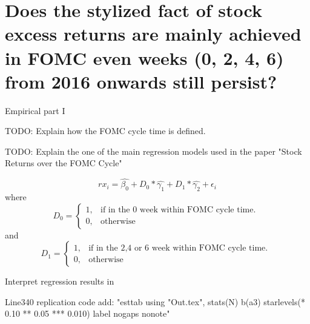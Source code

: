 \chapter{Does the stylized fact of stock excess returns are mainly achieved in FOMC even weeks (0,  2,  4,  6) from 2016 onwards still persist?}



Empirical part I

TODO: Explain how the FOMC cycle time is defined.

TODO: Explain the one of the main regression models used in the paper "Stock Returns over the FOMC Cycle" \parencite{cieslak_stock_2019}

\begin{equation}
	rx_{i}=\hat{\beta_{0}}+D_0*\hat{\gamma_{1}}+D_1*\hat{\gamma_{2}}+\epsilon_i
\end{equation}
where
\begin{equation}
    D_0=
    \begin{cases}
      1, & \text{if in the 0 week within FOMC cycle time. }\\
      0, & \text{otherwise}
    \end{cases}
\end{equation}
and
\begin{equation}
    D_1=
    \begin{cases}
      1, & \text{if in the 2,4 or 6 week within FOMC cycle time. } \\
      0, & \text{otherwise}
    \end{cases}
\end{equation}


Interpret regression results in  \parencite{cieslak_stock_2019}

Line340 replication code add:
"esttab using "Out.tex", stats(N) b(a3) starlevels(*  0.10 ** 0.05 *** 0.010) label nogaps nonote"

